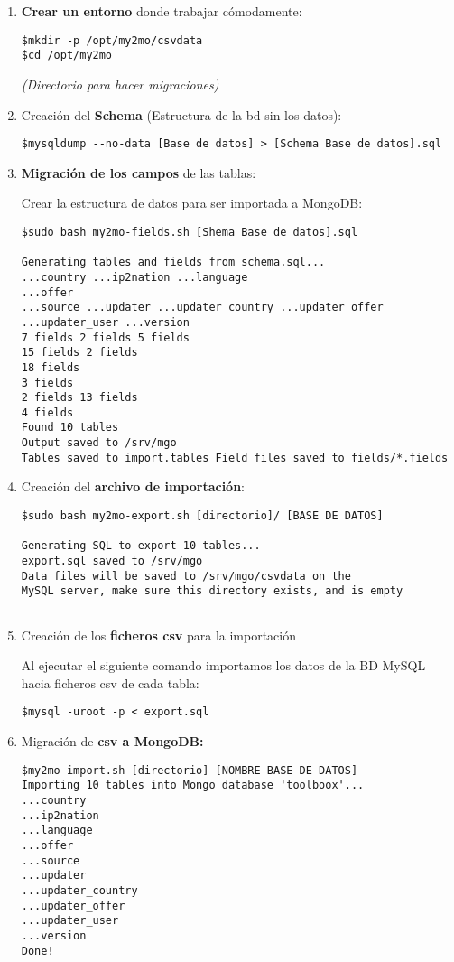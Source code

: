 \documentclass[12pt,a4paper]{article}
\begin{document}
\begin{enumerate}
\item \textbf{Crear un entorno} donde trabajar cómodamente: 
\begin{verbatim}
$mkdir -p /opt/my2mo/csvdata 
$cd /opt/my2mo
\end{verbatim}
\textit{(Directorio para hacer migraciones)}

\item Creación del \textbf{Schema} (Estructura de la bd sin los datos): 
\begin{verbatim}
$mysqldump --no-data [Base de datos] > [Schema Base de datos].sql
\end{verbatim}

\item \textbf{Migración de los campos} de las tablas:

Crear la estructura de datos para ser importada a MongoDB: 
\begin{verbatim}
$sudo bash my2mo-fields.sh [Shema Base de datos].sql

Generating tables and fields from schema.sql...
...country ...ip2nation ...language
...offer
...source ...updater ...updater_country ...updater_offer ...updater_user ...version
7 fields 2 fields 5 fields
15 fields 2 fields
18 fields
3 fields
2 fields 13 fields
4 fields
Found 10 tables
Output saved to /srv/mgo
Tables saved to import.tables Field files saved to fields/*.fields
\end{verbatim}

\item Creación del \textbf{archivo de importación}:

\begin{verbatim}
$sudo bash my2mo-export.sh [directorio]/ [BASE DE DATOS]

Generating SQL to export 10 tables...
export.sql saved to /srv/mgo
Data files will be saved to /srv/mgo/csvdata on the
MySQL server, make sure this directory exists, and is empty
 
\end{verbatim}

\item Creación de los \textbf{ficheros csv} para la importación

Al ejecutar el siguiente comando importamos los datos de la BD MySQL hacia ficheros csv de cada tabla: 
\begin{verbatim} 
$mysql -uroot -p < export.sql
\end{verbatim}

\item Migración de \textbf{csv a MongoDB:}
\begin{verbatim} 
$my2mo-import.sh [directorio] [NOMBRE BASE DE DATOS]
Importing 10 tables into Mongo database 'toolboox'...
...country
...ip2nation
...language
...offer
...source
...updater
...updater_country
...updater_offer
...updater_user
...version
Done!
\end{verbatim}


\end{enumerate}
\end{document}
